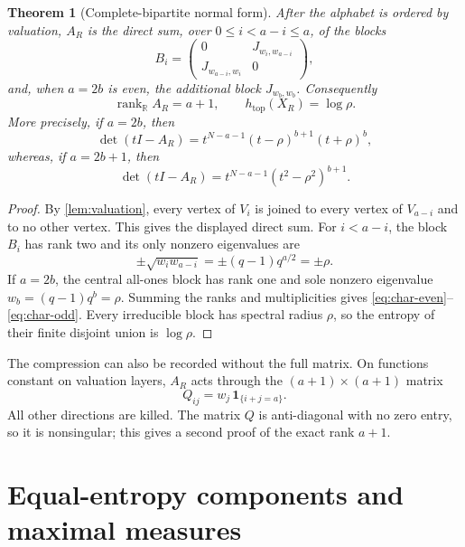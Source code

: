 \documentclass[11pt,a4paper]{amsart}
\newtheorem{theorem}{Theorem}[section]
\theoremstyle{definition}
\theoremstyle{remark}
\newcommand{\htop}{h_{\mathrm{top}}}
\begin{document}
\begin{theorem}[Complete-bipartite normal form]
\label{thm:normal}
After the alphabet is ordered by valuation, $A_R$ is the direct sum, over
$0\leq i<a-i\leq a$, of the blocks
\begin{equation}\label{eq:bipartite-block}
 B_i=
 \begin{pmatrix}
 0&J_{w_i,w_{a-i}}\\
 J_{w_{a-i},w_i}&0
 \end{pmatrix},
\end{equation}
and, when $a=2b$ is even, the additional block $J_{w_b,w_b}$.
Consequently
\[
 \operatorname{rank}_{\mathbb R}A_R=a+1,
 \qquad
 \htop(X_R)=\log\rho.
\]
More precisely, if $a=2b$, then
\begin{equation}\label{eq:char-even}
 \det(tI-A_R)=
 t^{N-a-1}(t-\rho)^{b+1}(t+\rho)^b,
\end{equation}
whereas, if $a=2b+1$, then
\begin{equation}\label{eq:char-odd}
 \det(tI-A_R)=
 t^{N-a-1}(t^2-\rho^2)^{b+1}.
\end{equation}
\end{theorem}

\begin{proof}
By \cref{lem:valuation}, every vertex of $V_i$ is joined to every vertex of
$V_{a-i}$ and to no other vertex.  This gives the displayed direct sum.
For $i<a-i$, the block $B_i$ has rank two and its only nonzero eigenvalues
are
\[
 \pm\sqrt{w_iw_{a-i}}=\pm(q-1)q^{a/2}=\pm\rho.
\]
If $a=2b$, the central all-ones block has rank one and sole nonzero
eigenvalue $w_b=(q-1)q^b=\rho$.  Summing the ranks and multiplicities gives
\eqref{eq:char-even}--\eqref{eq:char-odd}.  Every irreducible block has
spectral radius $\rho$, so the entropy of their finite disjoint union is
$\log\rho$.
\end{proof}

The compression can also be recorded without the full matrix.  On functions
constant on valuation layers, $A_R$ acts through the $(a+1)\times(a+1)$
matrix
\begin{equation}\label{eq:quotient}
 Q_{ij}=w_j\,\mathbf 1_{\{i+j=a\}}.
\end{equation}
All other directions are killed.  The matrix $Q$ is anti-diagonal with no
zero entry, so it is nonsingular; this gives a second proof of the exact
rank $a+1$.

\section{Equal-entropy components and maximal measures}
\label{sec:mme}
\end{document}
